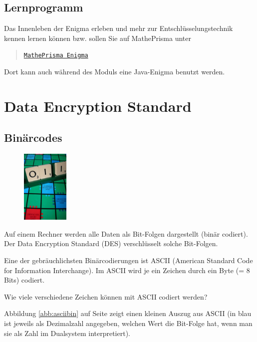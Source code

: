 \documentclass[%
11pt,%
twoside,%
titlepage,%
german,%
headsepline%
]{scrartcl}
\begin{document}
\subsection{Lernprogramm}
Das Innenleben der Enigma erleben und mehr zur Entschlüsselungstechnik kennen lernen k\"onnen bzw. sollen Sie auf MathePrisma unter
\begin{quote}
\href{http://www.matheprisma.uni-wuppertal.de/Module/Enigma/index.htm}{\texttt{MathePrisma Enigma}}
\end{quote}
Dort kann auch während des Moduls eine Java-Enigma benutzt werden.

\clearpage

\section{Data Encryption Standard}
\subsection{Binärcodes}

\begin{figure}
\vspace{-26pt}
  \begin{center}
    \includegraphics[width=0.2\textwidth]{pictures/scrabble}
  \end{center}
\vspace{-0pt}
\end{figure}
Auf einem Rechner werden alle Daten als Bit-Folgen dargestellt (binär codiert). Der Data Encryption Standard (DES) verschlüsselt solche Bit-Folgen.

Eine der gebräuchlichsten Binärcodierungen ist ASCII (American Standard Code for Information Interchange). Im ASCII wird je ein Zeichen durch ein Byte (= 8 Bits) codiert.
\begin{ueb}
Wie viele verschiedene Zeichen k\"onnen mit ASCII codiert werden?
\end{ueb}

Abbildung \ref{abb:asciibin} auf Seite \pageref{abb:asciibin} zeigt einen kleinen Auszug aus ASCII (in blau ist jeweils als Dezimalzahl angegeben, welchen Wert die Bit-Folge hat, wenn man sie als Zahl im Dualsystem interpretiert).
\end{document}
